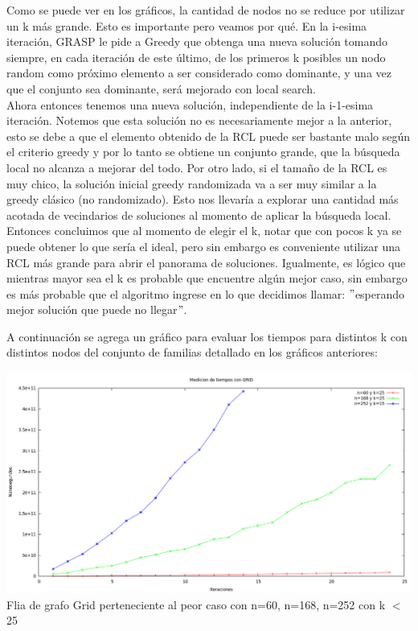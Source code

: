 Como se puede ver en los gráficos, la cantidad de nodos no se reduce por utilizar un k más grande. Esto es importante pero veamos por qué.
En la i-esima iteración, GRASP le pide a Greedy que obtenga una nueva solución tomando siempre, en cada iteración de este último, de los primeros k posibles un nodo random como 
próximo elemento a ser considerado como dominante, y una vez que el conjunto sea dominante, será mejorado con local search.\\
Ahora entonces tenemos una nueva solución, independiente de la i-1-esima iteración. Notemos que esta solución no es necesariamente mejor a la anterior, 
esto se debe a que el elemento obtenido de la RCL puede ser bastante malo según el criterio greedy y por lo
tanto se obtiene un conjunto grande, que la búsqueda local no alcanza a mejorar del todo. Por otro lado, si el tamaño de la
RCL es muy chico, la solución inicial greedy randomizada va a ser muy similar a la greedy clásico (no randomizado). Esto nos
llevaría a explorar una cantidad más acotada de vecindarios de soluciones al momento de aplicar la búsqueda local.
Entonces concluimos que al momento de elegir el k, notar que con pocos k ya se puede obtener lo que sería el ideal, pero sin embargo es conveniente utilizar una RCL
más grande para abrir el panorama de soluciones. Igualmente, es lógico que mientras mayor sea el k es probable que encuentre algún mejor caso, sin embargo es más probable
que el algoritmo ingrese en lo que decidimos llamar: $"$esperando mejor solución que puede no llegar$"$.

A continuación se agrega un gráfico para evaluar los tiempos para distintos k con distintos nodos del conjunto de familias detallado en los gráficos anteriores:


\begin{center}
\includegraphics[width=17cm]{./graficos/grasp/medicionesdetiempocongrid.png}\\
Flia de grafo Grid perteneciente al peor caso con n=60, n=168, n=252 con k $<$ 25
\end{center}

